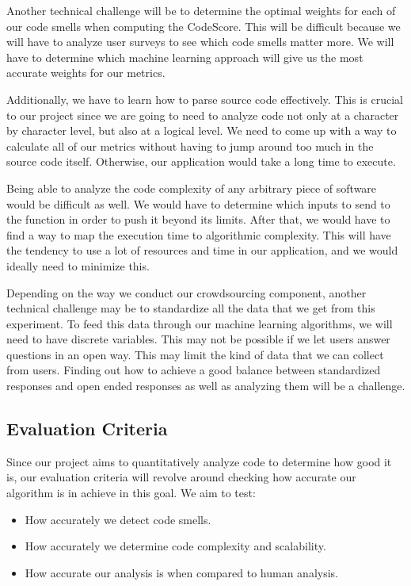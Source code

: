 \documentclass{sig-alternate}
\begin{document}
Another technical challenge will be to determine the optimal weights for each of our code smells when computing the CodeScore. This will be difficult because we will have to analyze user surveys to see which code smells matter more. We will have to determine which machine learning approach will give us the most accurate weights for our metrics. 

Additionally, we have to learn how to parse source code effectively. This is crucial to our project since we are going to need to analyze code not only at a character by character level, but also at a logical level. We need to come up with a way to calculate all of our metrics without having to jump around too much in the source code itself. Otherwise, our application would take a long time to execute.

Being able to analyze the code complexity of any arbitrary piece of software would be difficult as well. We would have to determine which inputs to send to the function in order to push it beyond its limits. After that, we would have to find a way to map the execution time to algorithmic complexity. This will have the tendency to use a lot of resources and time in our application, and we would ideally need to minimize this.

Depending on the way we conduct our crowdsourcing component, another technical challenge may be to standardize all the data that we get from this experiment. To feed this data through our machine learning algorithms, we will need to have discrete variables. This may not be possible if we let users answer questions in an open way. This may limit the kind of data that we can collect from users. Finding out how to achieve a good balance between standardized responses and open ended responses as well as analyzing them will be a challenge.

\subsection{Evaluation Criteria}
\label{subsec:eval_criteria}

Since our project aims to quantitatively analyze code to determine how good it is, our evaluation criteria will revolve around checking how accurate our algorithm is in achieve in this goal. We aim to test:

\begin{itemize}
\item How accurately we detect code smells.
\item How accurately we determine code complexity and scalability.
\item How accurate our analysis is when compared to human analysis.
\end{itemize}
\end{document}
